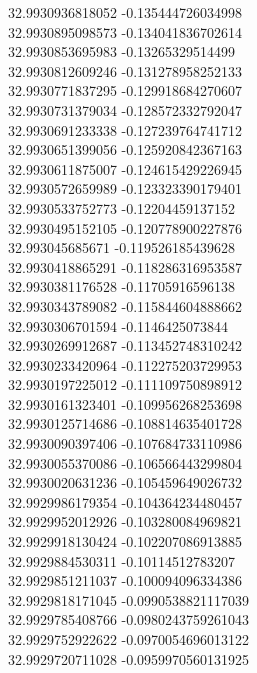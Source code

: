 {32.9930936818052	-0.135444726034998\\
32.9930895098573	-0.134041836702614\\
32.9930853695983	-0.13265329514499\\
32.9930812609246	-0.131278958252133\\
32.9930771837295	-0.129918684270607\\
32.9930731379034	-0.128572332792047\\
32.9930691233338	-0.127239764741712\\
32.9930651399056	-0.125920842367163\\
32.9930611875007	-0.124615429226945\\
32.9930572659989	-0.123323390179401\\
32.9930533752773	-0.12204459137152\\
32.9930495152105	-0.120778900227876\\
32.993045685671	-0.119526185439628\\
32.9930418865291	-0.118286316953587\\
32.9930381176528	-0.11705916596138\\
32.9930343789082	-0.115844604888662\\
32.9930306701594	-0.1146425073844\\
32.9930269912687	-0.113452748310242\\
32.9930233420964	-0.112275203729953\\
32.9930197225012	-0.111109750898912\\
32.9930161323401	-0.109956268253698\\
32.9930125714686	-0.108814635401728\\
32.9930090397406	-0.107684733110986\\
32.9930055370086	-0.106566443299804\\
32.9930020631236	-0.105459649026732\\
32.9929986179354	-0.104364234480457\\
32.9929952012926	-0.103280084969821\\
32.9929918130424	-0.102207086913885\\
32.9929884530311	-0.10114512783207\\
32.9929851211037	-0.100094096334386\\
32.9929818171045	-0.0990538821117039\\
32.9929785408766	-0.0980243759261043\\
32.9929752922622	-0.0970054696013122\\
32.9929720711028	-0.0959970560131925\\
}
